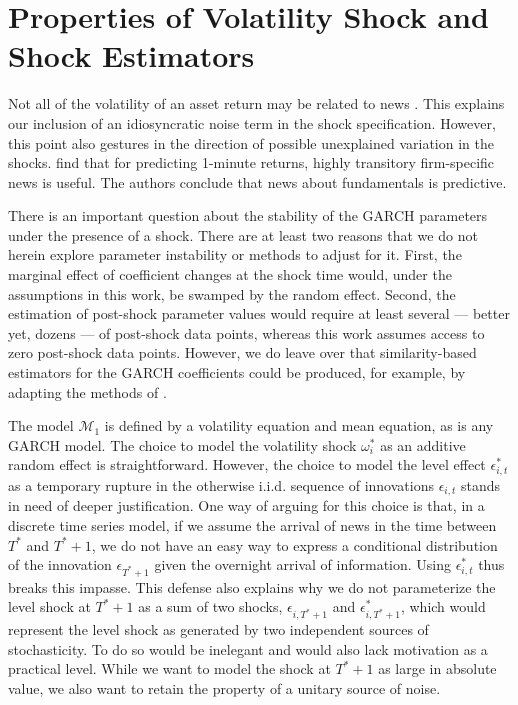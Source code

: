 \documentclass[11pt]{article}
\def\mc#1{\mathcal{#1}} %
\def\mc#1{\mathcal{#1}}
\theoremstyle{definition}
\begin{document}
\section{Properties of Volatility Shock and Shock Estimators}\label{SVF_properties}

Not all of the volatility of an asset return may be related to news \citep{boudoukh2019information}.  This explains our inclusion of an idiosyncratic noise term in the shock specification.  However, this point also gestures in the direction of possible unexplained variation in the shocks.  \citet{chinco2019sparse} find that for predicting 1-minute returns, highly transitory firm-specific news is useful.  The authors conclude that news about fundamentals is predictive.

There is an important question about the stability of the GARCH parameters under the presence of a shock.  There are at least two reasons that we do not herein explore parameter instability or methods to adjust for it.  First, the marginal effect of coefficient changes at the shock time would, under the assumptions in this work, be swamped by the random effect.  Second, the estimation of post-shock parameter values would require at least several --- better yet, dozens --- of post-shock data points, whereas this work assumes access to zero post-shock data points.  However, we do leave over that similarity-based estimators for the GARCH coefficients could be produced, for example, by adapting the methods of \citet{dendramis2020similarity}.

The model $\mc{M}_1$ is defined by a volatility equation and mean equation, as is any GARCH model.  The choice to model the volatility shock $\omega^{*}_{i}$ as an additive random effect is straightforward.  However, the choice to model the level effect $\epsilon^{*}_{i,t}$ as a temporary rupture in the otherwise i.i.d. sequence of innovations $\epsilon_{i,t}$ stands in need of deeper justification.  One way of arguing for this choice is that, in a discrete time series model, if we assume the arrival of news in the time between $T^{*}$ and $T^{*}+1$, we do not have an easy way to express a conditional distribution of the innovation $\epsilon_{T^{*}+1}$ given the overnight arrival of information.  Using $\epsilon^{*}_{i,t}$ thus breaks this impasse.  This defense also explains why we do not parameterize the level shock at $T^{*}+1$ as a sum of two shocks, $\epsilon_{i,T^{*}+1}$ and $\epsilon^{*}_{i,T^{*}+1}$, which would represent the level shock as generated by two independent sources of stochasticity.  To do so would be inelegant and would also lack motivation as a practical level.  While we want to model the shock at $T^{*}+1$ as large in absolute value, we also want to retain the property of a unitary source of noise.
\end{document}
